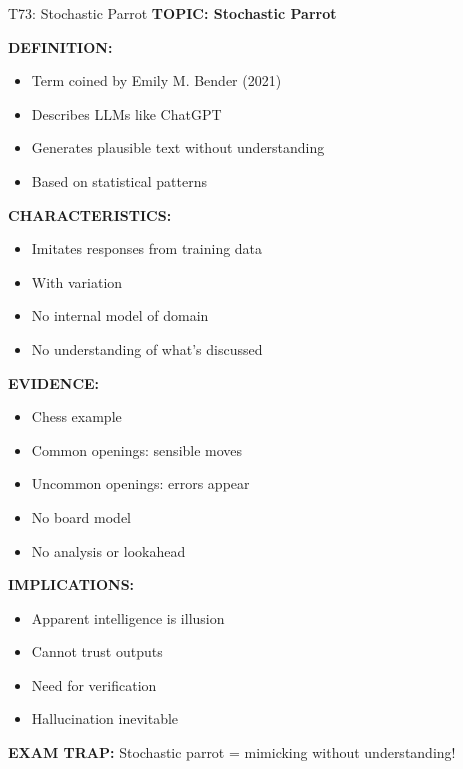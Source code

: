 \documentclass[8pt]{beamer}
\begin{document}
	\begin{frame}{T73: Stochastic Parrot}
		\fontsize{6.5}{7.5}\selectfont
		\textbf{TOPIC: Stochastic Parrot}
		
		\vspace{0.1cm}
		\textbf{DEFINITION:}
		\begin{itemize}
			\item Term coined by Emily M. Bender (2021)
			\item Describes LLMs like ChatGPT
			\item Generates plausible text without understanding
			\item Based on statistical patterns
		\end{itemize}
		
		\vspace{0.1cm}
		\textbf{CHARACTERISTICS:}
		\begin{itemize}
			\item Imitates responses from training data
			\item With variation
			\item No internal model of domain
			\item No understanding of what's discussed
		\end{itemize}
		
		\vspace{0.1cm}
		\textbf{EVIDENCE:}
		\begin{itemize}
			\item Chess example
			\item Common openings: sensible moves
			\item Uncommon openings: errors appear
			\item No board model
			\item No analysis or lookahead
		\end{itemize}
		
		\vspace{0.1cm}
		\textbf{IMPLICATIONS:}
		\begin{itemize}
			\item Apparent intelligence is illusion
			\item Cannot trust outputs
			\item Need for verification
			\item Hallucination inevitable
		\end{itemize}
		
		\textcolor{myred}{\textbf{EXAM TRAP:}} Stochastic parrot = \textcolor{myblue}{mimicking without understanding}!
	\end{frame}
	
\end{document}
